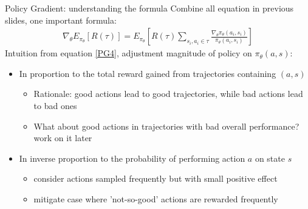 \begin{frame}{Policy Gradient: understanding the formula}
    Combine all equation in previous slides, one important formula:
        \begin{equation}
            \label{PG4}
            \begin{split}
                \nabla_\theta E_{\pi_{\theta}}[R(\tau)] = E_{\pi_{\theta}}[R(\tau)\sum\limits_{s_i,a_i \in \tau}\frac{\nabla_\theta\pi_\theta(a_i,s_i)}{\pi_\theta(a_i,s_i)}]
            \end{split}
        \end{equation}
    Intuition from equation \ref{PG4}, adjustment magnitude of policy on $\pi_{\theta}(a,s)$:\vspace{0.2cm}
    \begin{itemize}
        \item In proportion to the total reward gained from trajectories containing $(a,s)$\vspace{0.2cm}
        \begin{itemize}
            \item Rationale: good actions lead to good trajectories, while bad actions lead to bad ones\vspace{0.2cm}
            \item What about good actions in trajectories with bad overall performance? work on it later\vspace{0.2cm}
        \end{itemize}\vspace{0.2cm}
        \item In inverse proportion to the probability of performing action $a$ on state $s$\vspace{0.2cm}
        \begin{itemize}
            \item consider actions sampled frequently but with small positive effect\vspace{0.2cm}
            \item mitigate case where 'not-so-good' actions are rewarded frequently\vspace{0.2cm}
        \end{itemize}
    \end{itemize}
\end{frame}

\iffalse
\begin{frame}{Vanilla Policy Gradient: \textbf{REINFORCE}}
    So far, we obtain the first policy gradient algotithm called \href{http://www-anw.cs.umass.edu/~barto/courses/cs687/williams92simple.pdf}{\textbf{REINFORCE}} \textcolor{CUHKgreen}{\footnotesize[Williams, R. J.]}
    \begin{center}\texttt{[image: REINFORCE]}\end{center}
\end{frame}
\fi

